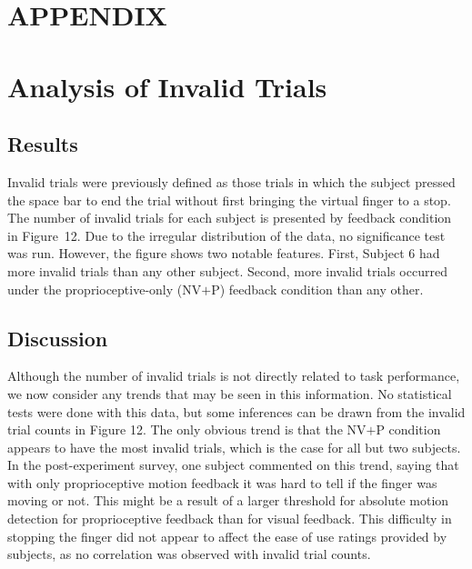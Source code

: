 \documentclass[prodmode,acmtap]{acmlarge}
\begin{document}
\appendix
\section*{APPENDIX}
\setcounter{section}{1}







\elecappendix


\section{Analysis of Invalid Trials}
\label{invalid}

\subsection{Results}


Invalid trials were previously defined as those trials in which the
subject pressed the space bar to end the trial without first bringing
the virtual finger to a stop. The number of invalid trials for each
subject is presented by feedback condition in Figure~12. Due to the
irregular distribution of the data, no significance test was run.
However, the figure shows two notable features. First, Subject 6 had
more invalid trials than any other subject. Second, more invalid
trials occurred under the proprioceptive-only (NV$+$P) feedback
condition than any other.



\subsection{Discussion}

Although the number of invalid trials is not directly related to task
performance, we now consider any trends that may be seen in this
information. No statistical tests were done with this data, but some
inferences can be drawn from the invalid trial counts in Figure 12.
The only obvious trend is that the NV$+$P condition appears to have
the most invalid trials, which is the case for all but two subjects.
In the post-experiment survey, one subject commented on this trend,
saying that with only proprioceptive motion feedback it was hard to
tell if the finger was moving or not. This might be a result of a
larger threshold for absolute motion detection for proprioceptive
feedback than for visual feedback. This difficulty in stopping the
finger did not appear to affect the ease of use ratings provided by
subjects, as no correlation was observed with invalid trial counts.
\end{document}
